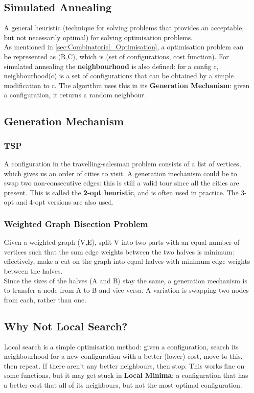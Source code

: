 \subsection{Simulated Annealing}
A general heuristic (technique for solving problems that provides an acceptable, but not necessarily optimal) for solving optimisation problems. \\
As mentioned in \ref{sec:Combinatorial_Optimisation}, a optimisation problem can be represented as (R,C), which is (set of configurations, cost function). For simulated annealing the \textbf{neighbourhood} is also defined: for a config c, neighbourhood(c) is a set of configurations that can be obtained by a simple modification to c. The algorithm uses this in its \textbf{Generation Mechanism}: given a configuration, it returns a random neighbour.

\subsection{Generation Mechanism}

\subsubsection{TSP}
A configuration in the travelling-salesman problem consists of a list of vertices, which gives us an order of cities to visit. A generation mechanism could be to swap two non-consecutive edges: this is still a valid tour since all the cities are present. This is called the \textbf{2-opt heuristic}, and is often used in practice. The 3-opt and 4-opt versions are also used.

\subsubsection{Weighted Graph Bisection Problem}
Given a weighted graph (V,E), split V into two parts with an equal number of vertices such that the sum edge weights between the two halves is minimum: effectively, make a cut on the graph into equal halves with minimum edge weights between the halves. \\
Since the sizes of the halves (A and B) stay the same, a generation mechanism is to transfer a node from A to B and vice versa. A variation is swapping two nodes from each, rather than one.

\subsection{Why Not Local Search?}
Local search is a simple optimisation method: given a configuration, search its neighbourhood for a new configuration with a better (lower) cost, move to this, then repeat. If there aren't any better neighbours, then stop. This works fine on some functions, but it may get stuck in \textbf{Local Minima}: a configuration that has a better cost that all of its neighbours, but not the most optimal configuration.

